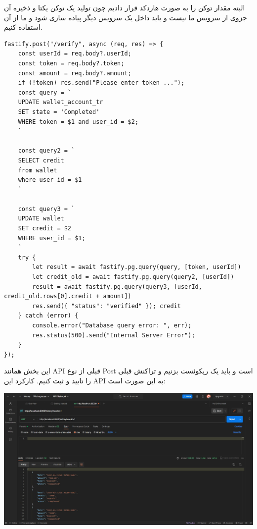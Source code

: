 البته مقدار توکن را به صورت هاردکد قرار دادیم چون تولید یک توکن یکتا و ذخیره آن جزوی از سرویس ما نیست و باید داخل یک سرویس دیگر پیاده سازی شود و ما از آن استفاده کنیم.
\pagebreak
\setLTR
\begin{lstlisting} 
fastify.post("/verify", async (req, res) => {
    const userId = req.body?.userId;
    const token = req.body?.token;
    const amount = req.body?.amount;
    if (!token) res.send("Please enter token ...");
    const query = `
    UPDATE wallet_account_tr
    SET state = 'Completed'
    WHERE token = $1 and user_id = $2;
    `

    const query2 = `
    SELECT credit
    from wallet
    where user_id = $1
    `

    const query3 = `
    UPDATE wallet
    SET credit = $2
    WHERE user_id = $1;
    `
    try {
        let result = await fastify.pg.query(query, [token, userId])
        let credit_old = await fastify.pg.query(query2, [userId])
        result = await fastify.pg.query(query3, [userId, credit_old.rows[0].credit + amount])
        res.send({ "status": "verified" }); credit
    } catch (error) {
        console.error("Database query error: ", err);
        res.status(500).send("Internal Server Error");
    }
});
\end{lstlisting}
\setRTL
این بخش همانند API قبلی از نوع Post است و باید یک ریکوئست بزنیم و تراکنش قبلی را تایید و ثبت کنیم. کارکرد این API به این صورت است:

\qquad \qquad \qquad \includegraphics[width=0.7\linewidth]{figs/api3.jpg}

